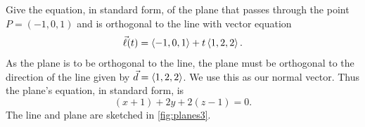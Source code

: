 \begin{example}\label{ex_planes3}%
Give the equation, in standard form, of the plane that passes through the point $P=(-1,0,1)$ and is orthogonal to the line with vector equation
\[\vec \ell(t) =\left\langle -1,0,1\right\rangle+ t\left\langle 1,2,2\right\rangle.\]
\solution
As the plane is to be orthogonal to the line, the plane must be orthogonal to the direction of the line given by $\vec d =\left\langle 1,2,2\right\rangle$. We use this as our normal vector. Thus the plane's equation, in standard form, is
\[(x+1) +2y+2(z-1)=0.\]
The line and plane are sketched in \autoref{fig:planes3}.
\end{example}

